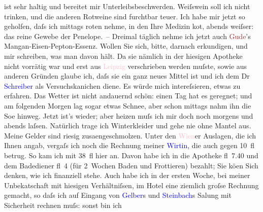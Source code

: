                ist sehr \label{K_L00181_1v}\label{K_L00181_1h}haltig und
               bereitet mir Unterleibsbeschwerden. Weiſswein soll ich nicht trinken, und die anderen
               Rotweine sind furchtbar teuer. Ich habe mir jetzt so geholfen, daſs ich mittags roten
               nehme, in den Ihre Medizin ko{\geminationm}t, abends weiſser: das
               reine Gewebe der Penelope. – Dreimal täglich nehme ich jetzt auch \textcolor{brown}{Gude}{}\ledrightnote{\textcolor{brown}{Dr. A. Gude GmbH.}}’s Mangan-Eisen-Pepton-Essenz. Wollen Sie sich, bitte, darnach
               erkundigen, und mir schreiben, was man davon hält. Da sie nämlich in der hiesigen
               Apotheke nicht vorrätig war und erst aus \textcolor{pink}{Leipzig}{}\ledrightnote{\textcolor{pink}{Leipzig}}
               verschrieben werden muſste, sowie aus anderen Gründen glaube ich, daſs sie ein ganz
               neues Mittel ist und ich dem Dr \textcolor{blue}{Schreiber}{}\ledrightnote{\textcolor{blue}{Joseph Schreiber}} als
               Versuchskanichen diene. Es würde mich intereſsieren, etwas zu erfahren.\pend
           \pstart
           Das Wetter ist nicht andauernd schön: einen Tag hat es geregnet; und am folgenden
               Morgen lag sogar etwas Schnee, aber schon mittags nahm ihn die So{\geminationn}e hinweg. Jetzt ist’s wieder; aber heizen muſs ich mir
               doch noch morgens und abends laſsen. Natürlich trage ich Winterkleider und gehe nie
               ohne Mantel aus.\pend
           \pstart
           Meine Gelder sind riesig zusa{\geminationm}engeschmolzen. Unter den
                  \textcolor{pink}{Wien}{}\ledrightnote{\textcolor{pink}{Wien}}er Auslagen, die ich Ihnen angab, vergaſs {\pb}ich noch die Rechnung meiner \textcolor{blue}{Wirtin}{}, die auch gegen 10 fl betrug. So kam
               ich mit 38 fl hier an. Davon habe ich in die Apotheke fl 7.40 und dem Badediener fl 4
               (für 2 Wochen Baden und Frottieren) bezahlt; Sie kö{\geminationn}en
               Sich denken, wie ich finanziell stehe. Auch habe ich in der ersten Woche, bei meiner
                  Unbeka{\geminationn}tschaft mit hiesigen Verhältniſsen, im Hotel
               eine ziemlich groſse Rechnung gemacht, so daſs ich auf Eingang von \textcolor{blue}{Gelber}{}\ledrightnote{\textcolor{blue}{Ludwig Gelber}}s und \textcolor{blue}{Steinbach}{}\ledrightnote{\textcolor{blue}{Josef Steinbach}}s Sa{\geminationm}lung mit Sicherheit rechnen muſs: sonst bin ich
